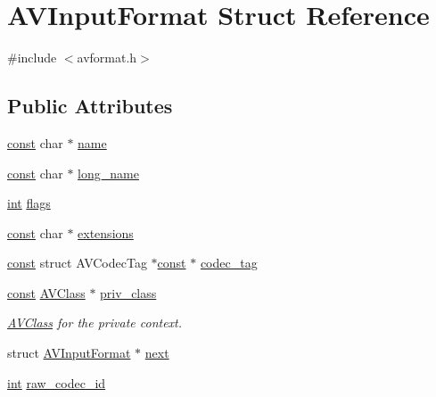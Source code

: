 \hypertarget{struct_a_v_input_format}{}\section{A\+V\+Input\+Format Struct Reference}
\label{struct_a_v_input_format}


{\ttfamily \#include $<$avformat.\+h$>$}

\subsection*{Public Attributes}
\begin{DoxyCompactItemize}
\item 
\hyperlink{getopt1_8c_a2c212835823e3c54a8ab6d95c652660e}{const} char $\ast$ \hyperlink{struct_a_v_input_format_a850db3eb225e22b64f3304d72134ca0c}{name}
\item 
\hyperlink{getopt1_8c_a2c212835823e3c54a8ab6d95c652660e}{const} char $\ast$ \hyperlink{struct_a_v_input_format_a1f67064a527941944017f1dfe65d3aa9}{long\+\_\+name}
\item 
\hyperlink{xmltok_8h_a5a0d4a5641ce434f1d23533f2b2e6653}{int} \hyperlink{struct_a_v_input_format_a1b30f6647d0c2faf38ba8786d7c3a838}{flags}
\item 
\hyperlink{getopt1_8c_a2c212835823e3c54a8ab6d95c652660e}{const} char $\ast$ \hyperlink{struct_a_v_input_format_ae692e27e532f664f26e2501967b09eab}{extensions}
\item 
\hyperlink{getopt1_8c_a2c212835823e3c54a8ab6d95c652660e}{const} struct A\+V\+Codec\+Tag $\ast$\hyperlink{getopt1_8c_a2c212835823e3c54a8ab6d95c652660e}{const} $\ast$ \hyperlink{struct_a_v_input_format_a88738bb721c18df24fb4207aa2d4924a}{codec\+\_\+tag}
\item 
\hyperlink{getopt1_8c_a2c212835823e3c54a8ab6d95c652660e}{const} \hyperlink{struct_a_v_class}{A\+V\+Class} $\ast$ \hyperlink{struct_a_v_input_format_afaac829559ad9e07618c01a51d8a4c5f}{priv\+\_\+class}
\begin{DoxyCompactList}\small\item\em \hyperlink{struct_a_v_class}{A\+V\+Class} for the private context. \end{DoxyCompactList}\item 
struct \hyperlink{struct_a_v_input_format}{A\+V\+Input\+Format} $\ast$ \hyperlink{struct_a_v_input_format_ad18d8584bb0648f53a7980be8f368164}{next}
\item 
\hyperlink{xmltok_8h_a5a0d4a5641ce434f1d23533f2b2e6653}{int} \hyperlink{struct_a_v_input_format_ac12c67e8e0b7bc2b0c26ab383d9a0c76}{raw\+\_\+codec\+\_\+id}

\end{DoxyCompactItemize}
